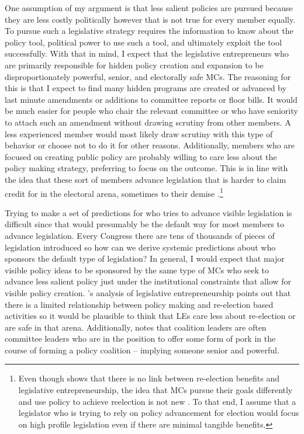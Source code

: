 \documentclass[12pt]{article}
\begin{document}
One assumption of my argument is that less salient policies are pursued because they are less costly politically however that is not true for every member equally. To pursue such a legislative strategy requires the information to know about the policy tool, political power to use such a tool, and ultimately exploit the tool successfully. With that in mind, I expect that the legislative entrepreneurs who are primarily responsible for hidden policy creation and expansion to be disproportionately powerful, senior, and electorally safe MCs. The reasoning for this is that I expect to find many hidden programs are created or advanced by last minute amendments or additions to committee reports or floor bills. It would be much easier for people who chair the relevant committee or who have seniority to attach such an amendment without drawing scrutiny from other members. A less experienced member would most likely draw scrutiny with this type of behavior or choose not to do it for other reasons. Additionally, members who are focused on creating public policy are probably willing to care less about the  policy making strategy, preferring to focus on the outcome. This is in line with the idea that these sort of members advance legislation that is harder to claim credit for in the electoral arena, sometimes to their demise \citep{hibbing1991, wawro2001}.\footnote{Even though \citet{wawro2001} shows that there is no link between re-election benefits and legislative entrepreneurship, the idea that MCs pursue their goals differently and use policy to achieve reelection is not new \citep{fenno1973, kernell1999}. To that end, I assume that a legislator who is trying to rely on policy advancement for election would focus on high profile legislation even if there are minimal tangible benefits.}

Trying to make a set of predictions for who tries to advance visible legislation is difficult since that would presumably be the default way for most members to advance legislation. Every Congress there are tens of thousands of pieces of legislation introduced so how can we derive systemic predictions about who sponsors the default type of legislation? In general, I would expect that major visible policy ideas to be sponsored by the same type of MCs who seek to advance less salient policy just under the institutional constraints that allow for visible policy creation. \citet{wawro2001}'s analysis of legislative entrepreneurship points out that there is a limited relationship between policy making and re-election based activities so it would be plausible to think that LEs care less about re-election or are safe in that arena. Additionally, \citet{evans2004} notes that coalition leaders are often committee leaders who are in the position to offer some form of pork in the course of forming a policy coalition -- implying someone senior and powerful. 
\end{document}
